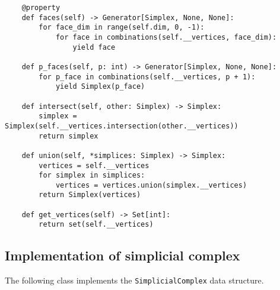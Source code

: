 \begin{verbatim}
    @property
    def faces(self) -> Generator[Simplex, None, None]:
        for face_dim in range(self.dim, 0, -1):
            for face in combinations(self.__vertices, face_dim):
                yield face

    def p_faces(self, p: int) -> Generator[Simplex, None, None]:
        for p_face in combinations(self.__vertices, p + 1):
            yield Simplex(p_face)

    def intersect(self, other: Simplex) -> Simplex:
        simplex = Simplex(self.__vertices.intersection(other.__vertices))
        return simplex

    def union(self, *simplices: Simplex) -> Simplex:
        vertices = self.__vertices
        for simplex in simplices:
            vertices = vertices.union(simplex.__vertices)
        return Simplex(vertices)

    def get_vertices(self) -> Set[int]:
        return set(self.__vertices)
\end{verbatim}

\subsection{Implementation of simplicial complex}

The following class implements the \texttt{SimplicialComplex} data structure.

